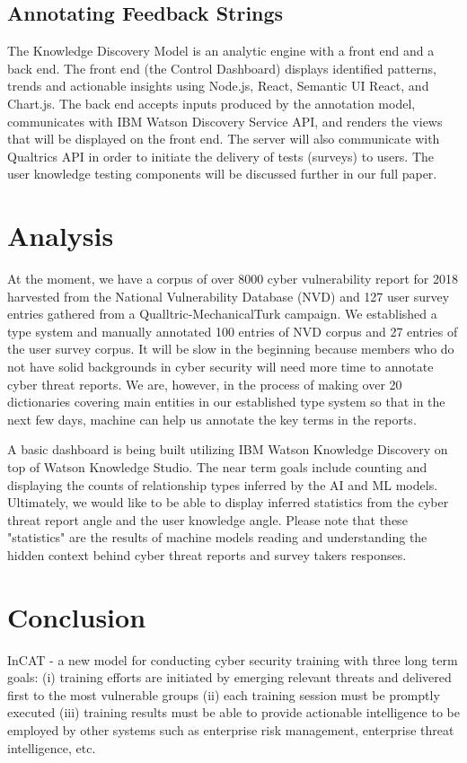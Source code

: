 \documentclass[conference]{IEEEtran}
\begin{document}
\subsection{Annotating Feedback Strings}
The Knowledge Discovery Model is an analytic engine with a front end and a back end. The front end (the Control Dashboard) displays identified patterns, trends and actionable insights using Node.js, React, Semantic UI React, and Chart.js. The back end accepts inputs produced by the annotation model, communicates with IBM Watson Discovery Service API, and renders the views that will be displayed on the front end. The server will also communicate with Qualtrics API in order to initiate the delivery of tests (surveys) to users. The user knowledge testing components will be discussed further in our full paper.

\section{Analysis}
At the moment, we have a corpus of over 8000 cyber vulnerability report for 2018 harvested from the National Vulnerability Database (NVD) and 127 user survey entries gathered from a Qualltric-MechanicalTurk campaign. We established a type system and manually annotated 100 entries of NVD corpus and 27 entries of the user survey corpus. It will be slow in the beginning because members who do not have solid backgrounds in cyber security will need more time to annotate cyber threat reports. We are, however, in the process of making over 20 dictionaries covering main entities in our established type system so that in the next few days, machine can help us annotate the key terms in the reports.

A basic dashboard is being built utilizing IBM Watson Knowledge Discovery on top of Watson Knowledge Studio. The near term goals include counting and displaying the counts of relationship types inferred by the AI and ML models. Ultimately, we would like to be able to display inferred statistics from the cyber threat report angle and the user knowledge angle. Please note that these "statistics" are the results of machine models reading and understanding the hidden context behind cyber threat reports and survey takers responses.

\section{Conclusion}

InCAT - a new model for conducting cyber security training with three long term goals: (i) training efforts are initiated by emerging relevant threats and delivered first to the most vulnerable groups (ii) each training session must be promptly executed (iii) training results must be able to provide actionable intelligence to be employed by other systems such as enterprise risk management, enterprise threat intelligence, etc.
\end{document}
